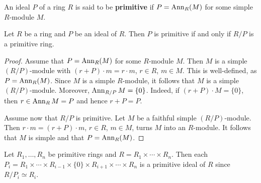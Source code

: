 \chapter{}
\label{04}

\begin{definition}
An ideal $P$ of a ring $R$ is said to be \textbf{primitive} if $P=\operatorname{Ann}_R(M)$
for some simple $R$-module $M$. 
\end{definition}

\begin{lemma}
	\label{lemma:primitivo}
	Let $R$ be a ring and $P$ be an ideal of $R$. Then $P$ is primitive if and only if 
	$R/P$ is a primitive ring.
\end{lemma}

\begin{proof}
	Assume that $P=\operatorname{Ann}_R(M)$ for some $R$-module $M$. Then $M$ is a simple 
	$(R/P)$-module with $(r+P)\cdot m=r\cdot m$, $r\in R$, $m\in M$. This is well-defined, as 
	$P=\operatorname{Ann}_R(M)$. Since $M$ is a simple $R$-module, it follows that $M$ is 
	a simple $(R/P)$-module. Moreover, $\operatorname{Ann}_{R/P}M=\{0\}$. Indeed, if 
	$(r+P)\cdot M=\{0\}$, then $r\in\operatorname{Ann}_RM=P$ and hence $r+P=P$.

	Assume now that $R/P$ is primitive. Let $M$ be a faithful simple $(R/P)$-module. 
	Then $r\cdot m=(r+P)\cdot m$, $r\in R$,
	$m\in M$, turns $M$ into an $R$-module. It follows that $M$ is simple and that $P=\operatorname{Ann}_R(M)$. 
\end{proof}



\begin{example}
	Let $R_1,\dots,R_n$ be primitive rings and $R=R_1\times\cdots\times
	R_n$. Then each $P_i=R_1\times\cdots\times R_{i-1}\times\{0\}\times
	R_{i+1}\times\cdots\times R_n$ is a primitive ideal of $R$ since 
	$R/P_i\simeq R_i$.
\end{example}

